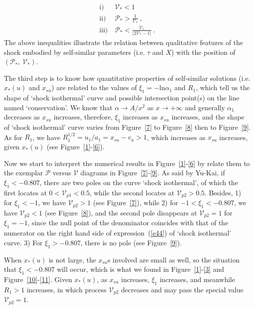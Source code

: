 \documentclass[fleqn,usenatbib]{mnras}
\begin{document}
\begin{align}
\mathrm{i)}&\ \mathcal{V}_{*}<1\, \label{e46}\\
\mathrm{ii)}&\ \mathcal{P}_{*}>\frac{1}{\mathcal{V}_{*}}\ ,\label{e47}\\
\mathrm{iii)}&\ \mathcal{P}_{*}<\frac{\mathcal{V}_{*}}{|2\mathcal{V}_{*}-1|}\ .\label{e48}
\end{align}
The above inequalities illustrate the relation between qualitative features of the shock embodied by self-similar parameters (i.e. $\tau$ and $X$) with the position of $(\mathcal{P}_{*},\ \mathcal{V}_{*})$. 

The third step is to know how quantitative properties of self-similar solutions (i.e. $x_{*}(u)$ and $x_{su}$) are related to the values of $\xi_{1}=-\mathrm{ln}\alpha_{1}$ and $R_{1}$, which tell us the shape of `shock isothermal' curve and possible intersection point(s) on the line named `conservation'. We know that $\alpha\rightarrow A/x^{2}$ as $x\rightarrow+\infty$ and generally $\alpha_{1}$ decreases as $x_{su}$ increases, therefore, $\xi_{1}$ increases as $x_{su}$ increases, and the shape of `shock isothermal' curve varies from Figure~\ref{7} to Figure~\ref{8} then to Figure~\ref{9}. As for $R_{1}$, we have $R_{1}^{1/2}=u_{1}/a_{1}=x_{su}-v_{u}>1$, which increases as $x_{su}$ increases, given $x_{*}(u)$ (see Figure~\ref{1}-\ref{6}).

Now we start to interpret the numerical results in Figure~\ref{1}-\ref{6} by relate them to the exemplar $\mathcal{P}$ versus $\mathcal{V}$ diagrams in Figure~\ref{7}-\ref{9}. As said by Yu-Kai, if $\xi_{1}<-0.807$, there are two poles on the curve `shock isothermal', of which the first locates at $0<\mathcal{V}_{p1}<0.5$, while the second locates at $\mathcal{V}_{p2}>0.5$. Besides, 1) for $\xi_{1}<-1$, we have $\mathcal{V}_{p2}>1$ (see Figure~\ref{7}), while 2) for $-1<\xi_{1}<-0.807$, we have $\mathcal{V}_{p2}<1$ (see Figure~\ref{8}), and the second pole disappears at $\mathcal{V}_{p2}=1$ for $\xi_{1}=-1$, since the null point of the denominator coincides with that of the numerator
on the right hand side of expression~(\ref{e44}) of `shock isothermal' curve. 3) For $\xi_{1}>-0.807$, there is no pole (see Figure~\ref{9}).

When $x_{*}(u)$ is not large, the $x_{su}$s involved are small as well, so the situation that $\xi_{1}<-0.807$ will occur, which is what we found in Figure~\ref{1}-\ref{3} and Figure~\ref{10}-\ref{11}. Given $x_{*}(u)$, as $x_{su}$ increases, $\xi_{1}$ increases, and meanwhile $R_{1}>1$ increases, in which process $\mathcal{V}_{p2}$ decreases and may pass the special value $\mathcal{V}_{p2}=1$. 
\end{document}

